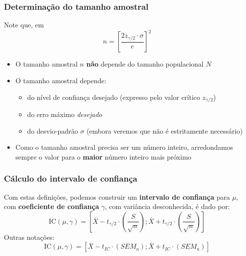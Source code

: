 \documentclass[11pt]{beamer}
\begin{document}
\begin{frame}
\frametitle{Determinação do tamanho amostral}

Note que, em \[
n = \left[ \frac{2 z_{\gamma/2} \cdot \sigma}{e} \right]^2
\]

\begin{itemize}
\item
  O tamanho amostral \(n\) \textbf{não} depende do tamanho populacional
  \(N\)
\item
  O tamanho amostral depende:

  \begin{itemize}
  \item
    do nível de confiança desejado (expresso pelo valor crítico
    \(z_{\gamma/2}\))
  \item
    do erro máximo \textsl{desejado}
  \item
    do desvio-padrão \(\sigma\) (embora veremos que não é estritamente
    necessário)
  \end{itemize}
\item
  Como o tamanho amostral precisa ser um número inteiro, arredondamos
  sempre o valor para o \textbf{maior} número inteiro mais próximo
\end{itemize}
\end{frame}

\begin{frame}
\frametitle{Cálculo do intervalo de confiança}

Com estas definições, podemos construir um \textbf{intervalo de
confiança} para \(\mu\), com \textbf{coeficiente de confiança}
\(\gamma\), com variância desconhecida, é dado por: \[
\text{IC}(\mu, \gamma) = \left[ \bar{X} - t_{\gamma/2} \cdot
  \left(\frac{S}{\sqrt{n}}\right) ; \bar{X} + t_{\gamma/2} \cdot
  \left(\frac{S}{\sqrt{n}}\right)  \right]
\]
Outras notações:
\[\text{IC}(\mu, \gamma) = \left[ \bar{X} - t_{IC} \cdot
  \left(SEM_a\right) ; \bar{X} + t_{IC} \cdot
  \left(SEM_a\right)  \right]
\]
\end{frame}
\end{document}
